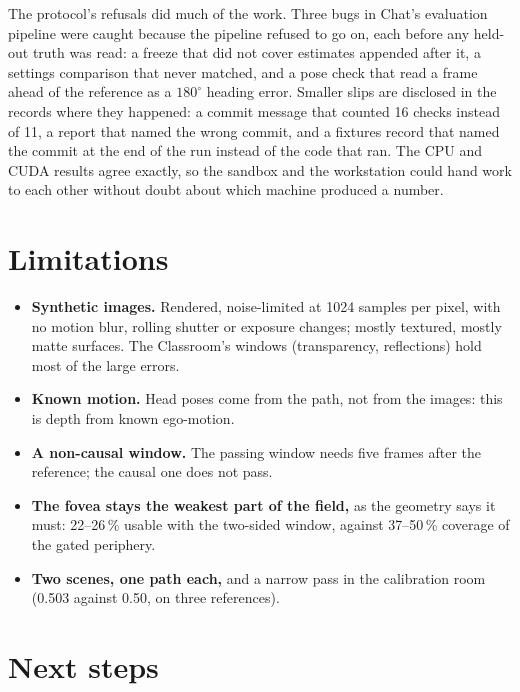 \documentclass[11pt,a4paper]{article}
\begin{document}
The protocol's refusals did much of the work. Three bugs in Chat's evaluation pipeline were caught because the pipeline
refused to go on, each before any held-out truth was read: a freeze that did not cover estimates appended after it, a
settings comparison that never matched, and a pose check that read a frame ahead of the reference as a $180^\circ$ heading
error. Smaller slips are disclosed in the records where they happened: a commit message that counted 16 checks instead of
11, a report that named the wrong commit, and a fixtures record that named the commit at the end of the run instead of
the code that ran. The CPU and CUDA results agree exactly, so the sandbox and the workstation could hand work to each other
without doubt about which machine produced a number.

\section{Limitations}\label{sec:limits}

\begin{itemize}
\item \textbf{Synthetic images.} Rendered, noise-limited at 1024 samples per pixel, with no motion blur, rolling shutter
  or exposure changes; mostly textured, mostly matte surfaces. The Classroom's windows (transparency, reflections) hold
  most of the large errors.
\item \textbf{Known motion.} Head poses come from the path, not from the images: this is depth from known ego-motion.
\item \textbf{A non-causal window.} The passing window needs five frames after the reference; the causal one does not
  pass.
\item \textbf{The fovea stays the weakest part of the field,} as the geometry says it must: 22--26\,\% usable with the
  two-sided window, against 37--50\,\% coverage of the gated periphery.
\item \textbf{Two scenes, one path each,} and a narrow pass in the calibration room (0.503 against 0.50, on three
  references).
\end{itemize}

\section{Next steps}\label{sec:next}
\end{document}
